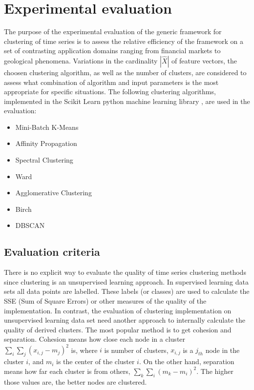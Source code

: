 \documentclass{article}
\begin{document}
\section{Experimental evaluation}

The purpose of the experimental evaluation of the generic framework for clustering of time series is to assess the relative efficiency of the framework on a set of contrasting application domains ranging from financial markets to geological phenomena. Variations in the cardinality $|\widehat{X}|$ of feature vectors, the choosen clustering algorithm, as well as the number of clusters, are considered to assess what combination of algorithm and input parameters is the most appropriate for specific situations. The following clustering algorithms, implemented in the Scikit Learn python machine learning library \cite{SKL15}, are used in the evaluation:

\begin{itemize}
\item Mini-Batch K-Means
\item Affinity Propagation
\item Spectral Clustering
\item Ward
\item Agglomerative Clustering
\item Birch
\item DBSCAN
\end{itemize}

\subsection{Evaluation criteria}

There is no explicit way to evaluate the quality of time series clustering methods since clustering is an unsupervised learning approach. In supervised learning data sets all data points are labelled. These labels (or classes) are used to calculate the SSE (Sum of Square Errors) or other measures of the quality of the implementation. In contrast, the evaluation of clustering implementation on unsupervised learning data set need another approach to internally calculate the quality of derived clusters. The most popular method is to get cohesion and separation. Cohesion means how close each node in a cluster $\sum_{i} \sum_{j} (x_{i,j}-m_j)^2$ is, where $i$ is number of clusters, $x_{i,j}$ is a $j_{th}$ node in the cluster $i$, and $m_{i}$ is the center of the cluster $i$. On the other hand, separation means how far each cluster is from others, $\sum_{k} \sum_{i} (m_{k}-m_{i})^2$. The higher those values are, the better nodes are clustered.
\end{document}

